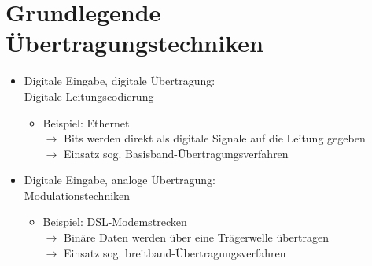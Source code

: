\documentclass{scrreprt}
\begin{document}
\section{Grundlegende Übertragungstechniken}
\begin{itemize}
	\item Digitale Eingabe, digitale Übertragung: \\\hyperref[sec:Leitungscodierung]{Digitale Leitungscodierung}
	      \begin{itemize}
		      \item Beispiel: Ethernet
		            \\$\rightarrow$ Bits werden direkt als digitale Signale auf die Leitung gegeben
			            \\$\rightarrow$ Einsatz sog. Basisband-Übertragungsverfahren
	      \end{itemize}
	\item Digitale Eingabe, analoge Übertragung: \\Modulationstechniken
	      \begin{itemize}
		      \item Beispiel: DSL-Modemstrecken
		            \\$\rightarrow$ Binäre Daten werden über eine Trägerwelle übertragen
			            \\$\rightarrow$ Einsatz sog. breitband-Übertragungsverfahren
	      \end{itemize}
\end{itemize}
\end{document}
